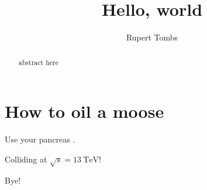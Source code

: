 \documentclass[]{article}
\title{Hello, world}
\author{Rupert Tombs}
\begin{document}
\maketitle

\begin{abstract}
abstract here
\end{abstract}

\section{How to oil a moose}

Use your pancreas \cite{helas}.

Colliding at $\sqrt{s} = \SI{13}{\TeV}$!

Bye!

{}

\end{document}
